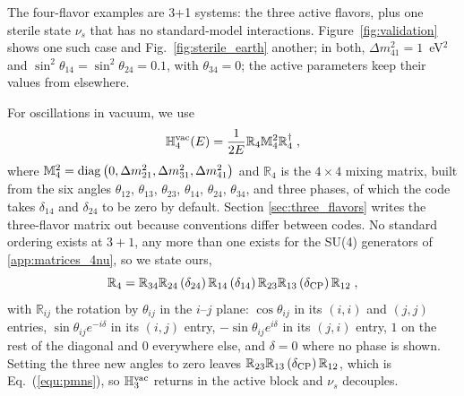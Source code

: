 \documentclass[final,5p,times,twocolumn,sort,compress]{elsarticle}
\newcommand{\eq}{Eq.}
\newcommand{\fig}{Fig.}
\newcommand{\equ}[1]{\eq~(\ref{equ:#1})}
\newcommand{\figu}[1]{\fig~\ref{fig:#1}}
\begin{document}
The four-flavor examples are 3+1 systems: the three active flavors, plus one sterile state $\nu_s$ that has no standard-model interactions.  Figure~\ref{fig:validation} shows one such case and \figu{sterile_earth} another; in both, $\Delta m_{41}^2 = 1$~eV$^2$ and $\sin^2\theta_{14} = \sin^2\theta_{24} = 0.1$, with $\theta_{34} = 0$; the active parameters keep their values from elsewhere.

For oscillations in vacuum, we use
\begin{equation}
 \mathbb{H}_4^{\rm vac}(E)
 =
 \frac{1}{2E}
 \mathbb{R}_4
 \mathbb{M}_4^2
 \mathbb{R}_4^\dagger \;,
\end{equation}
where $\mathbb{M}_4^2 = {\rm diag}\left(0, \Delta m_{21}^2, \Delta m_{31}^2, \Delta m_{41}^2\right)$ and $\mathbb{R}_4$ is the $4 \times 4$ mixing matrix, built from the six angles $\theta_{12}$, $\theta_{13}$, $\theta_{23}$, $\theta_{14}$, $\theta_{24}$, $\theta_{34}$, and three phases, of which the code takes $\delta_{14}$ and $\delta_{24}$ to be zero by default.  Section \ref{sec:three_flavors} writes the three-flavor matrix out because conventions differ between codes.  No standard ordering exists at $3+1$, any more than one exists for the SU(4) generators of \ref{app:matrices_4nu}, so we state ours,
\begin{equation}
 \mathbb{R}_4
 =
 \mathbb{R}_{34}
 \mathbb{R}_{24}\left(\delta_{24}\right)
 \mathbb{R}_{14}\left(\delta_{14}\right)
 \mathbb{R}_{23}
 \mathbb{R}_{13}\left(\delta_{\rm CP}\right)
 \mathbb{R}_{12} \;,
\end{equation}
with $\mathbb{R}_{ij}$ the rotation by $\theta_{ij}$ in the $i$--$j$ plane: $\cos\theta_{ij}$ in its $\left(i,i\right)$ and $\left(j,j\right)$ entries, $\sin\theta_{ij} e^{-i\delta}$ in its $\left(i,j\right)$ entry, $-\sin\theta_{ij} e^{i\delta}$ in its $\left(j,i\right)$ entry, $1$ on the rest of the diagonal and $0$ everywhere else, and $\delta = 0$ where no phase is shown.  Setting the three new angles to zero leaves $\mathbb{R}_{23} \mathbb{R}_{13}\left(\delta_{\rm CP}\right) \mathbb{R}_{12}$, which is \equ{pmns}, so $\mathbb{H}_3^{\rm vac}$ returns in the active block and $\nu_s$ decouples.
\end{document}
